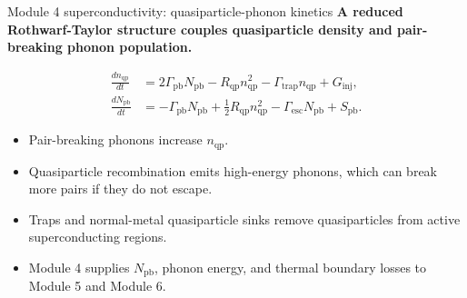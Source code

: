 \documentclass[aspectratio=169,10pt]{beamer}
\begin{document}
\begin{frame}{Module 4 superconductivity: quasiparticle-phonon kinetics}
\footnotesize
\textbf{A reduced Rothwarf-Taylor structure couples quasiparticle density and pair-breaking phonon population.}

\vspace{-0.2em}
\begin{align*}
\frac{dn_{\mathrm{qp}}}{dt}
&=2\Gamma_{\mathrm{pb}}N_{\mathrm{pb}}
-R_{\mathrm{qp}}n_{\mathrm{qp}}^2
-\Gamma_{\mathrm{trap}}n_{\mathrm{qp}}
+G_{\mathrm{inj}},\\[-0.05em]
\frac{dN_{\mathrm{pb}}}{dt}
&=-\Gamma_{\mathrm{pb}}N_{\mathrm{pb}}
+\frac{1}{2}R_{\mathrm{qp}}n_{\mathrm{qp}}^2
-\Gamma_{\mathrm{esc}}N_{\mathrm{pb}}
+S_{\mathrm{pb}}.
\end{align*}

\vspace{-0.25em}
\begin{itemize}
    \item Pair-breaking phonons increase $n_{\mathrm{qp}}$.
    \item Quasiparticle recombination emits high-energy phonons, which can break more pairs if they do not escape.
    \item Traps and normal-metal quasiparticle sinks remove quasiparticles from active superconducting regions.
    \item Module 4 supplies $N_{\mathrm{pb}}$, phonon energy, and thermal boundary losses to Module 5 and Module 6.
\end{itemize}
\end{frame}
\end{document}
